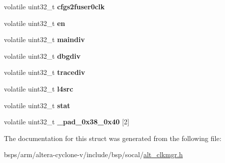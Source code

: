 \begin{DoxyCompactItemize}
volatile uint32\+\_\+t {\bfseries cfgs2fuser0clk}
\item 
\mbox{\label{structALT__CLKMGR__MAINPLL__raw__s_ae48bae078dd3feab1a0d00ad41fe9d10}} 
volatile uint32\+\_\+t {\bfseries en}
\item 
\mbox{\label{structALT__CLKMGR__MAINPLL__raw__s_a0b590e4b688360eb420745c1252b59ff}} 
volatile uint32\+\_\+t {\bfseries maindiv}
\item 
\mbox{\label{structALT__CLKMGR__MAINPLL__raw__s_a1c41db4fb9de4616a7ae7960cec7963c}} 
volatile uint32\+\_\+t {\bfseries dbgdiv}
\item 
\mbox{\label{structALT__CLKMGR__MAINPLL__raw__s_a6fa04bd002b2605b8c39b37004093fab}} 
volatile uint32\+\_\+t {\bfseries tracediv}
\item 
\mbox{\label{structALT__CLKMGR__MAINPLL__raw__s_a30a1bbc69af758c6dd9d6b08c0469107}} 
volatile uint32\+\_\+t {\bfseries l4src}
\item 
\mbox{\label{structALT__CLKMGR__MAINPLL__raw__s_a13187fc56b96b40e599e200557c9c11e}} 
volatile uint32\+\_\+t {\bfseries stat}
\item 
\mbox{\label{structALT__CLKMGR__MAINPLL__raw__s_a83e95b8ac81aae6ae928ade71fc5a4b9}} 
volatile uint32\+\_\+t {\bfseries \+\_\+pad\+\_\+0x38\+\_\+0x40} \mbox{[}2\mbox{]}
\end{DoxyCompactItemize}


The documentation for this struct was generated from the following file\+:\begin{DoxyCompactItemize}
\item 
bsps/arm/altera-\/cyclone-\/v/include/bsp/socal/\mbox{\hyperlink{alt__clkmgr_8h}{alt\+\_\+clkmgr.\+h}}\end{DoxyCompactItemize}
